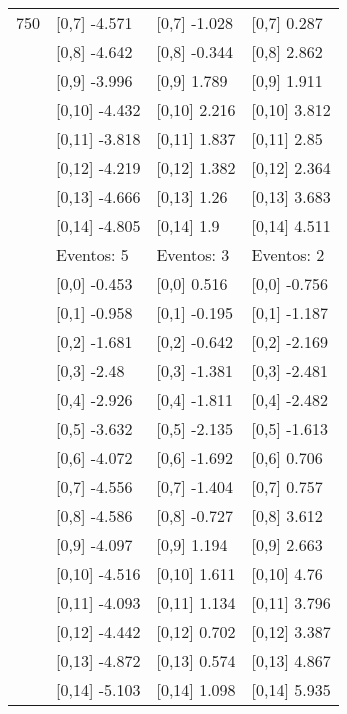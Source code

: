 \begin{table}
\begin{tabular}[t]{llll}
750 & {}[0,7] -4.571 & {}[0,7] -1.028 & {}[0,7] 0.287\\
\addlinespace
 & {}[0,8] -4.642 & {}[0,8] -0.344 & {}[0,8] 2.862\\
 & {}[0,9] -3.996 & {}[0,9] 1.789 & {}[0,9] 1.911\\
 & {}[0,10] -4.432 & {}[0,10] 2.216 & {}[0,10] 3.812\\
 & {}[0,11] -3.818 & {}[0,11] 1.837 & {}[0,11] 2.85\\
 & {}[0,12] -4.219 & {}[0,12] 1.382 & {}[0,12] 2.364\\
\addlinespace
 & {}[0,13] -4.666 & {}[0,13] 1.26 & {}[0,13] 3.683\\
 & {}[0,14] -4.805 & {}[0,14] 1.9 & {}[0,14] 4.511\\
 & Eventos:  5 & Eventos:  3 & Eventos:  2\\
 & {}[0,0] -0.453 & {}[0,0] 0.516 & {}[0,0] -0.756\\
 & {}[0,1] -0.958 & {}[0,1] -0.195 & {}[0,1] -1.187\\
\addlinespace
 & {}[0,2] -1.681 & {}[0,2] -0.642 & {}[0,2] -2.169\\
 & {}[0,3] -2.48 & {}[0,3] -1.381 & {}[0,3] -2.481\\
 & {}[0,4] -2.926 & {}[0,4] -1.811 & {}[0,4] -2.482\\
 & {}[0,5] -3.632 & {}[0,5] -2.135 & {}[0,5] -1.613\\
 & {}[0,6] -4.072 & {}[0,6] -1.692 & {}[0,6] 0.706\\
\addlinespace
1000 & {}[0,7] -4.556 & {}[0,7] -1.404 & {}[0,7] 0.757\\
 & {}[0,8] -4.586 & {}[0,8] -0.727 & {}[0,8] 3.612\\
 & {}[0,9] -4.097 & {}[0,9] 1.194 & {}[0,9] 2.663\\
 & {}[0,10] -4.516 & {}[0,10] 1.611 & {}[0,10] 4.76\\
 & {}[0,11] -4.093 & {}[0,11] 1.134 & {}[0,11] 3.796\\
\addlinespace
 & {}[0,12] -4.442 & {}[0,12] 0.702 & {}[0,12] 3.387\\
 & {}[0,13] -4.872 & {}[0,13] 0.574 & {}[0,13] 4.867\\
 & {}[0,14] -5.103 & {}[0,14] 1.098 & {}[0,14] 5.935\\
\bottomrule
\end{tabular}
\end{table}
